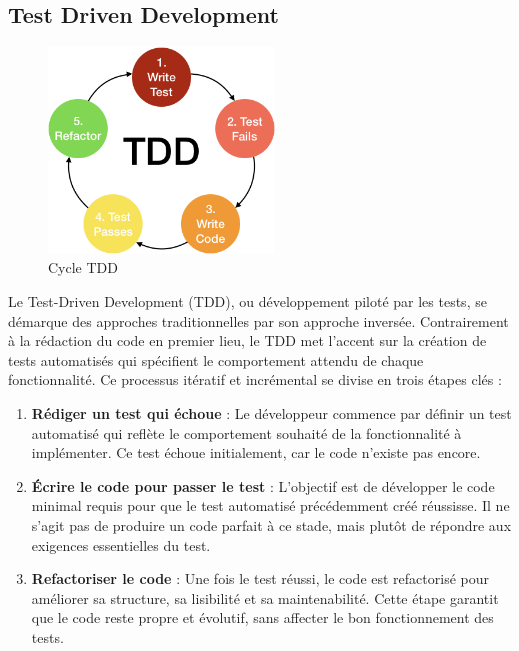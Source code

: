 \subsection{Test Driven Development}


\begin{figure}[H]
    \centering
    \includegraphics[width=6cm]{Figures/TDD.png}
    \caption{Cycle TDD}
\end{figure}



Le Test-Driven Development (TDD), ou développement piloté par les tests, se démarque des approches traditionnelles par son approche inversée. Contrairement à la rédaction du code en premier lieu, le TDD met l'accent sur la création de tests automatisés qui spécifient le comportement attendu de chaque fonctionnalité. Ce processus itératif et incrémental se divise en trois étapes clés :
\begin{enumerate}

    \item \textbf{Rédiger un test qui échoue} : Le développeur commence par définir un test automatisé qui reflète le comportement souhaité de la fonctionnalité à implémenter. Ce test échoue initialement, car le code n'existe pas encore.

    \item \textbf{Écrire le code pour passer le test} : L'objectif est de développer le code minimal requis pour que le test automatisé précédemment créé réussisse. Il ne s'agit pas de produire un code parfait à ce stade, mais plutôt de répondre aux exigences essentielles du test.

    \item \textbf{Refactoriser le code} : Une fois le test réussi, le code est refactorisé pour améliorer sa structure, sa lisibilité et sa maintenabilité. Cette étape garantit que le code reste propre et évolutif, sans affecter le bon fonctionnement des tests.
\end{enumerate}

